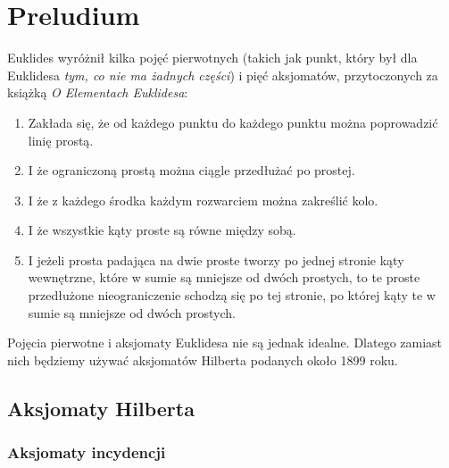 \documentclass{parchment}
\begin{document}


\chapter{Preludium}

Euklides wyróżnił kilka pojęć pierwotnych (takich jak punkt, który był dla Euklidesa \emph{tym, co nie ma żadnych części}) i pięć aksjomatów, przytoczonych za książką \emph{O Elementach Euklidesa}:

\begin{enumerate}
	\item Zakłada się, że od każdego punktu do każdego punktu można poprowadzić linię prostą.
	\item I że ograniczoną prostą można ciągle przedłużać po prostej.
	\item I że z każdego środka każdym rozwarciem można zakreślić kolo.
	\item I że wszystkie kąty proste są równe między sobą.
	\item I jeżeli prosta padająca na dwie proste tworzy po jednej stronie kąty wewnętrzne, które w sumie są mniejsze od dwóch prostych, to te proste przedłużone nieograniczenie schodzą się po tej stronie, po której kąty te w sumie są mniejsze od dwóch prostych.
\end{enumerate}

Pojęcia pierwotne i aksjomaty Euklidesa nie są jednak idealne.
Dlatego zamiast nich będziemy używać aksjomatów Hilberta podanych około 1899 roku.

\section{Aksjomaty Hilberta}
\subsection{Aksjomaty incydencji}
\end{document}
